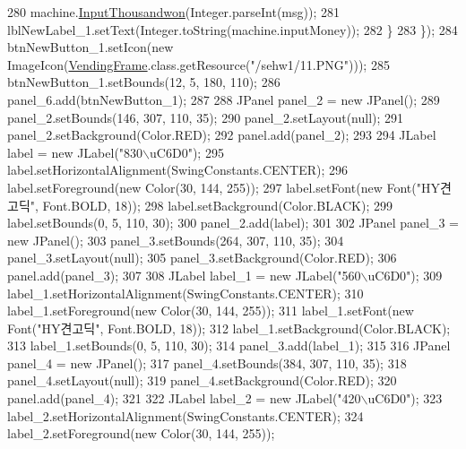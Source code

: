 \begin{DoxyCode}
280                 machine.\hyperlink{classsehw1_1_1machine_aa6727914a379c7a52bd3523cbfe0b21c}{InputThousandwon}(Integer.parseInt(msg));
281                 lblNewLabel\_1.setText(Integer.toString(machine.inputMoney));
282             \}
283         \});
284         btnNewButton\_1.setIcon(\textcolor{keyword}{new} ImageIcon(\hyperlink{classsehw1_1_1_vending_frame_a82f3d8fe653c04d594b0a46e751328a0}{VendingFrame}.class.getResource(\textcolor{stringliteral}{"/sehw1/11.PNG"})));
285         btnNewButton\_1.setBounds(12, 5, 180, 110);
286         panel\_6.add(btnNewButton\_1);
287         
288         JPanel panel\_2 = \textcolor{keyword}{new} JPanel();
289         panel\_2.setBounds(146, 307, 110, 35);
290         panel\_2.setLayout(null);
291         panel\_2.setBackground(Color.RED);
292         panel.add(panel\_2);
293         
294         JLabel label = \textcolor{keyword}{new} JLabel(\textcolor{stringliteral}{"830\(\backslash\)uC6D0"});
295         label.setHorizontalAlignment(SwingConstants.CENTER);
296         label.setForeground(\textcolor{keyword}{new} Color(30, 144, 255));
297         label.setFont(\textcolor{keyword}{new} Font(\textcolor{stringliteral}{"HY견고딕"}, Font.BOLD, 18));
298         label.setBackground(Color.BLACK);
299         label.setBounds(0, 5, 110, 30);
300         panel\_2.add(label);
301         
302         JPanel panel\_3 = \textcolor{keyword}{new} JPanel();
303         panel\_3.setBounds(264, 307, 110, 35);
304         panel\_3.setLayout(null);
305         panel\_3.setBackground(Color.RED);
306         panel.add(panel\_3);
307         
308         JLabel label\_1 = \textcolor{keyword}{new} JLabel(\textcolor{stringliteral}{"560\(\backslash\)uC6D0"});
309         label\_1.setHorizontalAlignment(SwingConstants.CENTER);
310         label\_1.setForeground(\textcolor{keyword}{new} Color(30, 144, 255));
311         label\_1.setFont(\textcolor{keyword}{new} Font(\textcolor{stringliteral}{"HY견고딕"}, Font.BOLD, 18));
312         label\_1.setBackground(Color.BLACK);
313         label\_1.setBounds(0, 5, 110, 30);
314         panel\_3.add(label\_1);
315         
316         JPanel panel\_4 = \textcolor{keyword}{new} JPanel();
317         panel\_4.setBounds(384, 307, 110, 35);
318         panel\_4.setLayout(null);
319         panel\_4.setBackground(Color.RED);
320         panel.add(panel\_4);
321         
322         JLabel label\_2 = \textcolor{keyword}{new} JLabel(\textcolor{stringliteral}{"420\(\backslash\)uC6D0"});
323         label\_2.setHorizontalAlignment(SwingConstants.CENTER);
324         label\_2.setForeground(\textcolor{keyword}{new} Color(30, 144, 255));

\end{DoxyCode}

